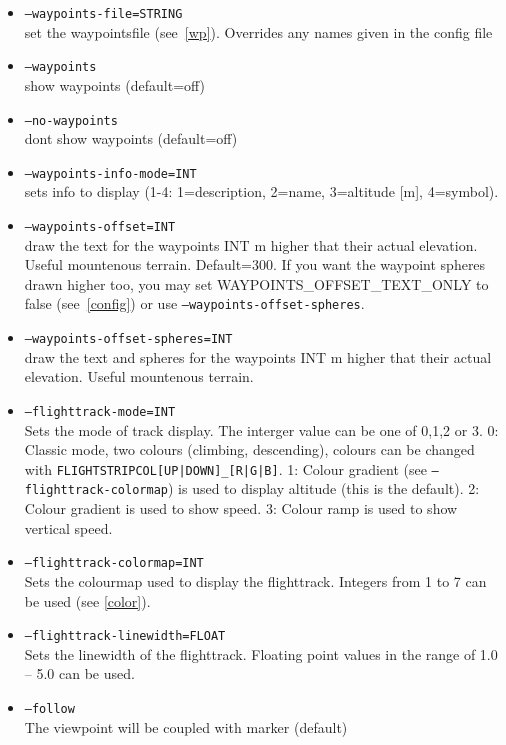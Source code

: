 \begin{itemize}
\item \texttt{--waypoints-file=STRING}\\
  set the waypointsfile (see~\ref{wp}). Overrides any names given in the config file
\item \texttt{--waypoints}\\
	show waypoints  (default=off)
\item \texttt{--no-waypoints}\\
        dont show waypoints  (default=off)
\item \texttt{--waypoints-info-mode=INT}\\
	sets info to display (1-4: 1=description, 2=name, 3=altitude [m], 4=symbol).

\item \texttt{--waypoints-offset=INT}\\
        draw the text for the waypoints INT m higher that their actual elevation. Useful mountenous terrain. Default=300. If you want the waypoint spheres drawn higher too, you may set WAYPOINTS\_OFFSET\_TEXT\_ONLY to false (see~\ref{config}) or use \texttt{--waypoints-offset-spheres}.

\item \texttt{--waypoints-offset-spheres=INT}\\
        draw the text and spheres for the waypoints INT m higher that their actual elevation. Useful mountenous terrain.

\item \texttt{--flighttrack-mode=INT}\\
Sets the mode of track display. The interger value can be one of 0,1,2 or 3. 0: Classic mode, two colours (climbing, descending), colours can
be changed with \texttt{FLIGHTSTRIPCOL[UP|DOWN]\_[R|G|B]}. 1: Colour gradient (see \texttt{--flighttrack-colormap}) is used to display altitude
(this is the default).
2: Colour gradient is used to show speed. 3: Colour ramp is used to show vertical speed.

\item \texttt{--flighttrack-colormap=INT}\\
Sets the colourmap used to display the flighttrack. Integers from 1 to 7 can be used (see \ref{color}).

\item \texttt{--flighttrack-linewidth=FLOAT}\\
Sets the linewidth of the flighttrack. Floating point values in the range of 1.0 -- 5.0 can be used.

\item \texttt{--follow} \\
The viewpoint will be coupled with marker (default)


\end{itemize}
